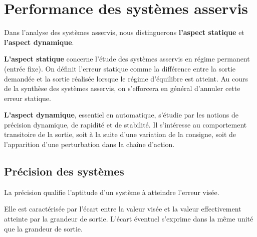\documentclass[10pt,fleqn]{article} %
\begin{document}
\section{Performance des systèmes asservis}
Dans l'analyse des systèmes asservis, nous distinguerons \textbf{l'aspect
statique} et \textbf{l'aspect dynamique}. 

\textbf{L'aspect statique} concerne l'étude des systèmes asservis en régime
permanent (entrée fixe). On définit l'erreur statique comme la différence entre
la sortie demandée et la sortie réalisée lorsque le régime d'équilibre est
atteint. Au cours de la synthèse des systèmes asservis, on s'efforcera en
général d'annuler cette erreur statique. 

\textbf{L'aspect dynamique}, essentiel en automatique, s'étudie par les notions
de précision dynamique, de rapidité et de stabilité. Il s'intéresse au
comportement transitoire de la sortie, soit à la suite d'une variation de la
consigne, soit de l'apparition d'une perturbation dans la chaîne d'action. 

\subsection{Précision des systèmes}
La précision qualifie l'aptitude d'un système à atteindre l'erreur visée. 

Elle est caractérisée par l'écart entre la valeur visée et la valeur
effectivement atteinte par la grandeur de sortie. L'écart éventuel s'exprime
dans la même unité que la grandeur de sortie. 
\end{document}
